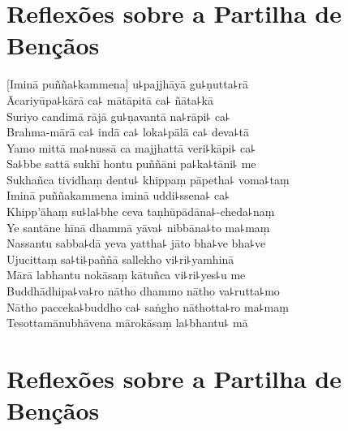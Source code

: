 \chapter*[Partilha de Bençãos]{Reflexões sobre a Partilha de Bençãos}

\delegateSetUseNext

\begin{leader}
\end{leader}


[Iminā puñña꜕kammena] u꜕pajjhāyā gu꜕ṇutta꜕rā\\
Ācariyūpa꜕kārā ca꜕ mātāpitā ca꜕ ñāta꜕kā\\
Suriyo candimā rājā gu꜕ṇavantā na꜕rāpi꜕ ca꜕\\
Brahma-mārā ca꜕ indā ca꜕ loka꜕pālā ca꜕ deva꜕tā\\
Yamo mittā ma꜕nussā ca majjhattā veri꜕kāpi꜕ ca꜕\\
Sa꜕bbe sattā sukhī hontu puññāni pa꜕ka꜕tāni꜕ me\\
Sukhañca tividhaṃ dentu꜕ khippaṃ pāpetha꜕ voma꜕taṃ\\
Iminā puññakammena iminā uddi꜕ssena꜕ ca꜕\\
Khipp'āhaṃ su꜕la꜕bhe ceva taṇhūpādāna꜕-cheda꜕naṃ\\
Ye santāne hīnā dhammā yāva꜕ nibbāna꜕to ma꜕maṃ\\
Nassantu sabba꜕dā yeva yattha꜕ jāto bha꜕ve bha꜕ve\\
Ujucittaṃ sa꜕ti꜕paññā sallekho vi꜕ri꜕yamhinā\\
Mārā labhantu nokāsaṃ kātuñca vi꜕ri꜕yes꜕u me\\
Buddhādhipa꜕va꜕ro nātho dhammo nātho va꜕rutta꜕mo\\
Nātho pacceka꜕buddho ca꜕ saṅgho nāthotta꜕ro ma꜕maṃ\\
Tesottamānubhāvena mārokāsaṃ la꜕bhantu꜕ mā

\chapter[Partilha de Bençãos]{Reflexões sobre a Partilha de Bençãos}

\enlargethispage{2\baselineskip}

\begin{leader}
\end{leader}



